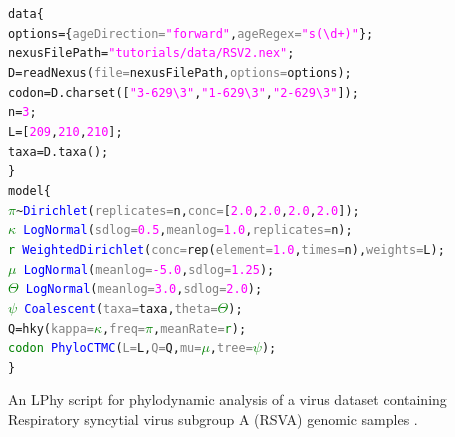 \documentclass[10pt,letterpaper,table]{article}
\begin{document}
{
  \small
  \begin{listing}
    \begin{alltt}
      data \{
      \quad options = \{\textcolor{gray}{ageDirection=}\textcolor{magenta}{"forward"}, \textcolor{gray}{ageRegex=}\textcolor{magenta}{"s(\textbackslash{}d+)"}\};
      \quad nexusFilePath = \textcolor{magenta}{"tutorials/data/RSV2.nex"};
      \quad D = \textcolor{magenta!80!black}{readNexus}(\textcolor{gray}{file=}nexusFilePath, \textcolor{gray}{options=}options);
      \quad codon = D.\textcolor{magenta!80!black}{charset}([\textcolor{magenta}{"3-629\textbackslash{}3"}, \textcolor{magenta}{"1-629\textbackslash{}3"}, \textcolor{magenta}{"2-629\textbackslash{}3"}]);
      \quad n = \textcolor{magenta}{3};
      \quad L = [\textcolor{magenta}{209}, \textcolor{magenta}{210}, \textcolor{magenta}{210}];
      \quad taxa = D.\textcolor{magenta!80!black}{taxa}();
      \}
      model \{
      \quad \textcolor{green}{\(\pi\)} \textasciitilde \textcolor{blue}{Dirichlet}(\textcolor{gray}{replicates=}n, \textcolor{gray}{conc=}[\textcolor{magenta}{2.0}, \textcolor{magenta}{2.0}, \textcolor{magenta}{2.0}, \textcolor{magenta}{2.0}]);
      \quad \textcolor{green}{\(\kappa\)} ~ \textcolor{blue}{LogNormal}(\textcolor{gray}{sdlog=}\textcolor{magenta}{0.5}, \textcolor{gray}{meanlog=}\textcolor{magenta}{1.0}, \textcolor{gray}{replicates=}n);
      \quad \textcolor{green}{r} ~ \textcolor{blue}{WeightedDirichlet}(\textcolor{gray}{conc=}\textcolor{magenta!80!black}{rep}(\textcolor{gray}{element=}\textcolor{magenta}{1.0}, \textcolor{gray}{times=}n), \textcolor{gray}{weights=}L);
      \quad \textcolor{green}{\(\mu\)} ~ \textcolor{blue}{LogNormal}(\textcolor{gray}{meanlog=}\textcolor{magenta}{-5.0}, \textcolor{gray}{sdlog=}\textcolor{magenta}{1.25});
      \quad \textcolor{green}{\(\Theta\)} ~ \textcolor{blue}{LogNormal}(\textcolor{gray}{meanlog=}\textcolor{magenta}{3.0}, \textcolor{gray}{sdlog=}\textcolor{magenta}{2.0});
      \quad \textcolor{green}{\(\psi\)} ~ \textcolor{blue}{Coalescent}(\textcolor{gray}{taxa=}taxa, \textcolor{gray}{theta=}\textcolor{green}{\(\Theta\)});
      \quad Q = \textcolor{magenta!80!black}{hky}(\textcolor{gray}{kappa=}\textcolor{green}{\(\kappa\)}, \textcolor{gray}{freq=}\textcolor{green}{\(\pi\)}, \textcolor{gray}{meanRate=}\textcolor{green}{r});
      \quad \textcolor{green}{codon} ~ \textcolor{blue}{PhyloCTMC}(\textcolor{gray}{L=}L, \textcolor{gray}{Q=}Q, \textcolor{gray}{mu=}\textcolor{green}{\(\mu\)}, \textcolor{gray}{tree=}\textcolor{green}{\(\psi\)});
      \}
    \end{alltt}
    \caption{An LPhy script for phylodynamic analysis of a virus dataset containing Respiratory syncytial virus subgroup A (RSVA) genomic samples \cite{zlateva2004molecular, zlateva2005genetic}.
    \newline}
    \label{lphy:rsva}
  \end{listing}
}
\end{document}
